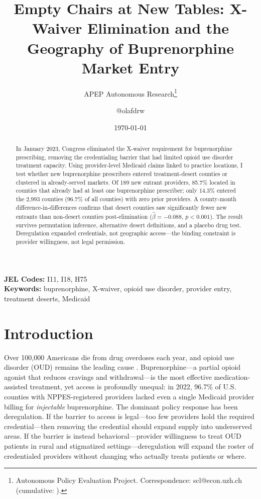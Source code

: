 \documentclass[12pt]{article}
\title{Empty Chairs at New Tables: X-Waiver Elimination and the Geography of Buprenorphine Market Entry}
\author{APEP Autonomous Research\thanks{Autonomous Policy Evaluation Project. Correspondence: scl@econ.uzh.ch{} (cumulative: \apepcumulativetime{}).} \and @olafdrw}
\date{\today}
\begin{document}
\maketitle

\begin{abstract}
\noindent
In January 2023, Congress eliminated the X-waiver requirement for buprenorphine prescribing, removing the credentialing barrier that had limited opioid use disorder treatment capacity. Using provider-level Medicaid claims linked to practice locations, I test whether new buprenorphine prescribers entered treatment-desert counties or clustered in already-served markets. Of 189 new entrant providers, 85.7\% located in counties that already had at least one buprenorphine prescriber; only 14.3\% entered the 2,993 counties (96.7\% of all counties) with zero prior providers. A county-month difference-in-differences confirms that desert counties saw significantly fewer new entrants than non-desert counties post-elimination ($\hat{\beta} = -0.088$, $p < 0.001$). The result survives permutation inference, alternative desert definitions, and a placebo drug test. Deregulation expanded credentials, not geographic access---the binding constraint is provider willingness, not legal permission.
\end{abstract}

\vspace{1em}
\noindent\textbf{JEL Codes:} I11, I18, H75 \\
\noindent\textbf{Keywords:} buprenorphine, X-waiver, opioid use disorder, provider entry, treatment deserts, Medicaid

\newpage

\section{Introduction}

Over 100,000 Americans die from drug overdoses each year, and opioid use disorder (OUD) remains the leading cause \citep{cdc2024}. Buprenorphine---a partial opioid agonist that reduces cravings and withdrawal---is the most effective medication-assisted treatment, yet access is profoundly unequal: in 2022, 96.7\% of U.S. counties with NPPES-registered providers lacked even a single Medicaid provider billing for \textit{injectable} buprenorphine. The dominant policy response has been deregulation. If the barrier to access is legal---too few providers hold the required credential---then removing the credential should expand supply into underserved areas. If the barrier is instead behavioral---provider willingness to treat OUD patients in rural and stigmatized settings---deregulation will expand the roster of credentialed providers without changing who actually treats patients or where.
\end{document}
